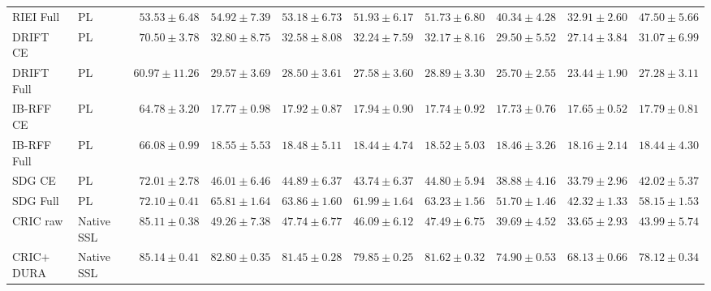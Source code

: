 \begin{table}[t]
\begin{tabular}{llrrrrrrrr}
RIEI Full & PL & $53.53\!\pm\!6.48$ & $54.92\!\pm\!7.39$ & $53.18\!\pm\!6.73$ & $51.93\!\pm\!6.17$ & $51.73\!\pm\!6.80$ & $40.34\!\pm\!4.28$ & $32.91\!\pm\!2.60$ & $47.50\!\pm\!5.66$ \\
DRIFT CE & PL & $70.50\!\pm\!3.78$ & $32.80\!\pm\!8.75$ & $32.58\!\pm\!8.08$ & $32.24\!\pm\!7.59$ & $32.17\!\pm\!8.16$ & $29.50\!\pm\!5.52$ & $27.14\!\pm\!3.84$ & $31.07\!\pm\!6.99$ \\
DRIFT Full & PL & $60.97\!\pm\!11.26$ & $29.57\!\pm\!3.69$ & $28.50\!\pm\!3.61$ & $27.58\!\pm\!3.60$ & $28.89\!\pm\!3.30$ & $25.70\!\pm\!2.55$ & $23.44\!\pm\!1.90$ & $27.28\!\pm\!3.11$ \\
IB-RFF CE & PL & $64.78\!\pm\!3.20$ & $17.77\!\pm\!0.98$ & $17.92\!\pm\!0.87$ & $17.94\!\pm\!0.90$ & $17.74\!\pm\!0.92$ & $17.73\!\pm\!0.76$ & $17.65\!\pm\!0.52$ & $17.79\!\pm\!0.81$ \\
IB-RFF Full & PL & $66.08\!\pm\!0.99$ & $18.55\!\pm\!5.53$ & $18.48\!\pm\!5.11$ & $18.44\!\pm\!4.74$ & $18.52\!\pm\!5.03$ & $18.46\!\pm\!3.26$ & $18.16\!\pm\!2.14$ & $18.44\!\pm\!4.30$ \\
SDG CE & PL & $72.01\!\pm\!2.78$ & $46.01\!\pm\!6.46$ & $44.89\!\pm\!6.37$ & $43.74\!\pm\!6.37$ & $44.80\!\pm\!5.94$ & $38.88\!\pm\!4.16$ & $33.79\!\pm\!2.96$ & $42.02\!\pm\!5.37$ \\
SDG Full & PL & $72.10\!\pm\!0.41$ & $65.81\!\pm\!1.64$ & $63.86\!\pm\!1.60$ & $61.99\!\pm\!1.64$ & $63.23\!\pm\!1.56$ & $51.70\!\pm\!1.46$ & $42.32\!\pm\!1.33$ & $58.15\!\pm\!1.53$ \\
\midrule
CRIC raw & Native SSL & $85.11\!\pm\!0.38$ & $49.26\!\pm\!7.38$ & $47.74\!\pm\!6.77$ & $46.09\!\pm\!6.12$ & $47.49\!\pm\!6.75$ & $39.69\!\pm\!4.52$ & $33.65\!\pm\!2.93$ & $43.99\!\pm\!5.74$ \\
CRIC$+$DURA & Native SSL & $85.14\!\pm\!0.41$ & $82.80\!\pm\!0.35$ & $81.45\!\pm\!0.28$ & $79.85\!\pm\!0.25$ & $81.62\!\pm\!0.32$ & $74.90\!\pm\!0.53$ & $68.13\!\pm\!0.66$ & $78.12\!\pm\!0.34$ \\
\bottomrule
\end{tabular}
\end{table}
